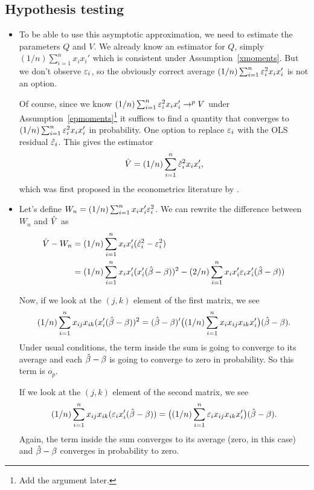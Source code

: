 \subsection{Hypothesis testing}

\begin{itemize}

\item To be able to use this asymptotic approximation, we need to
  estimate the parameters $Q$ and $V$.  We already know an estimator
  for $Q$, simply $(1/n) \sum_{i=1}^n x_i x_i'$ which is consistent under
  Assumption~\ref{xmoments}.  But we don't observe $\varepsilon_i$, so the
  obviously correct average $(1/n) \sum_{i=1}^n \varepsilon_i^2 x_i x_i'$ is not
  an option.

  Of course, since we know $(1/n) \sum_{i=1}^n \varepsilon_i^2 x_i x_i' \to^p V$
  under Assumption~\ref{epmoments}\footnote{Add the argument later.}
  it suffices to find a quantity that converges to $(1/n) \sum_{i=1}^n
  \varepsilon_i^2 x_i x_i'$ in probability.  One option to replace $\varepsilon_i$ with
  the OLS residual $\hat{\varepsilon}_i$.  This gives the estimator
  \begin{equation*}
    \hat{V} = (1/n) \sum_{i=1}^n \hat{\varepsilon}_i^2 x_i x_i',
  \end{equation*}
  which was first proposed in the econometrics literature by
  \citet{Whi80}.

\item Let's define $W_n = (1/n) \sum_{i=1}^n x_i x_i' \varepsilon_i^2$.  We can
  rewrite the difference between $W_n$ and $\hat{V}$ as
  \begin{align*}
    \hat{V} - W_n
    &= (1/n) \sum_{i=1}^n x_i x_i' (\hat{\varepsilon}^2_i - \varepsilon_i^2) \\
    &= (1/n) \sum_{i=1}^n x_i x_i' (x_i'(\hat{\beta} - \beta))^2
    - (2/n) \sum_{i=1}^n  x_i x_i' \varepsilon_i x_i'(\hat{\beta} - \beta))
  \end{align*}

  Now, if we look at the $(j,k)$ element of the first matrix, we see
  \begin{equation*}
    (1/n) \sum_{i=1}^n x_{ij} x_{ik}(x_i'(\hat{\beta} - \beta))^2 =
    (\hat{\beta} - \beta)' \big((1/n) \sum_{i=1}^n x_i x_{ij} x_{ik} x_{i}'\big) (\hat{\beta}- \beta).
  \end{equation*}
  Under usual conditions, the term inside the sum is going to converge
  to its average and each $\hat{\beta} - \beta$ is going to converge to zero in
  probability.  So this term is $o_p$.

  If we look at the $(j,k)$ element of the second matrix, we see
  \begin{equation*}
    (1/n) \sum_{i=1}^n x_{ij} x_{ik}(\varepsilon_i x_i'(\hat{\beta} - \beta)) =
    \big((1/n) \sum_{i=1}^n \varepsilon_i x_{ij} x_{ik} x_{i}'\big) (\hat{\beta}- \beta).
  \end{equation*}
  Again, the term inside the sum converges to its average (zero, in
  this case) and $\hat{\beta} - \beta$ converges in probability to zero.


\end{itemize}
